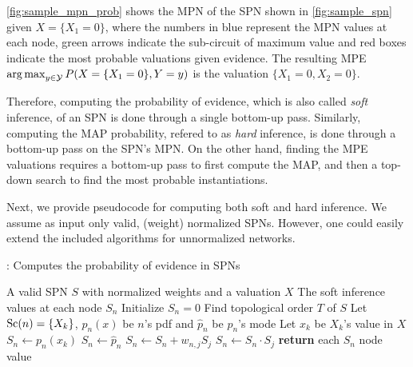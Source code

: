 \autoref{fig:sample_mpn_prob} shows the MPN of the SPN shown in \autoref{fig:sample_spn} given
$X=\{X_1=0\}$, where the numbers in blue represent the MPN values at each node, green arrows
indicate the sub-circuit of maximum value and red boxes indicate the most probable valuations given
evidence. The resulting MPE $\operatorname*{arg\,max}_{y\in\mathcal{Y}} P(X=\{X_1=0\},Y=y)$ is the valuation
$\{X_1=0, X_2=0\}$.

Therefore, computing the probability of evidence, which is also called \textit{soft} inference, of
an SPN is done through a single bottom-up pass. Similarly, computing the MAP probability, refered
to as \textit{hard} inference, is done through a bottom-up pass on the SPN's MPN\@.  On the other
hand, finding the MPE valuations requires a bottom-up pass to first compute the MAP, and then a
top-down search to find the most probable instantiations.

Next, we provide pseudocode for computing both soft and hard inference. We assume as input only
valid, (weight) normalized SPNs. However, one could easily extend the included algorithms for
unnormalized networks.

\begin{algorithm}[H]
  \caption{: Computes the probability of evidence in SPNs}
  \begin{algorithmic}[1]
    \Require A valid SPN $S$ with normalized weights and a valuation $X$
    \Ensure The soft inference values at each node $S_n$
    \State Initialize $S_n=0$
    \State Find topological order $T$ of $S$
        \State Let $\operatorname*{\text{Sc}}(n)=\{X_k\}$, $p_n(x)$ be $n$'s pdf and $\hat{p}_n$ be $p_n$'s mode
          \State Let $x_k$ be $X_k$'s value in $X$
          \State $S_n\gets p_n(x_k)$
        \Else%
          \State $S_n\gets\hat{p}_n$
        \EndIf%
          \State $S_n\gets S_n + w_{n,j}S_j$
        \EndFor%
      \Else%
          \State $S_n\gets S_n\cdot S_j$
        \EndFor%
      \EndIf
    \EndFor%
    \State \textbf{return} each $S_n$ node value
  \end{algorithmic}
\end{algorithm}

